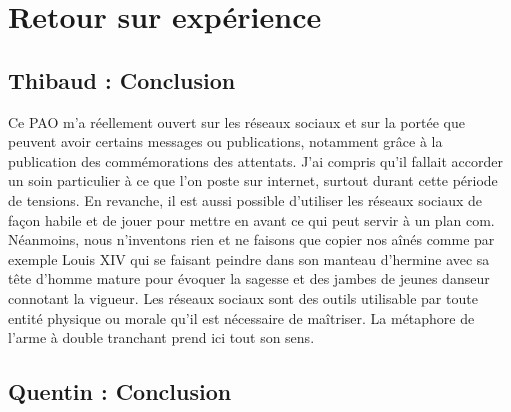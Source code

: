 \section{Retour sur expérience}
\subsection{Thibaud : Conclusion}

Ce PAO m'a réellement ouvert sur les réseaux sociaux et sur la portée que peuvent avoir certains messages ou publications, notamment grâce à la publication des commémorations des attentats. J'ai compris qu'il fallait accorder un soin particulier à ce que l'on poste sur internet, surtout durant cette période de tensions. En revanche, il est aussi possible d'utiliser les réseaux sociaux de façon habile et de jouer pour mettre en avant ce qui peut servir à un plan com.
Néanmoins, nous n'inventons rien et ne faisons que copier nos aînés comme par exemple Louis XIV qui se faisant peindre dans son manteau d'hermine avec sa tête d'homme mature pour évoquer la sagesse et des jambes de jeunes danseur connotant la vigueur.
Les réseaux sociaux sont des outils utilisable par toute entité physique ou morale qu'il est nécessaire de maîtriser. La métaphore de l'arme à double tranchant prend ici tout son sens.

\subsection{Quentin : Conclusion}

